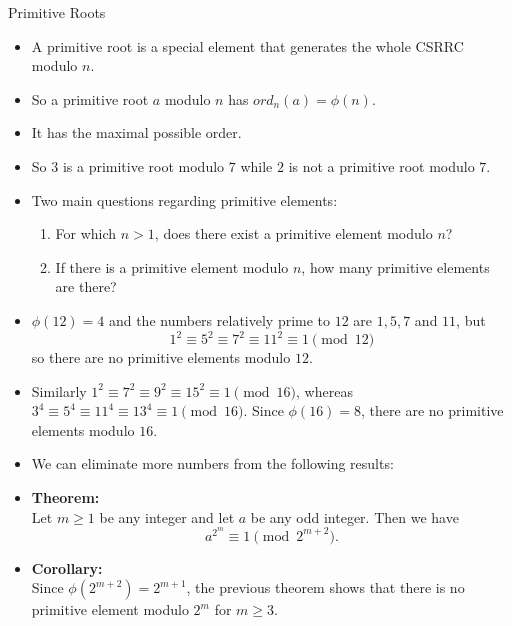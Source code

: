 \documentclass[ %
 usenames,dvipsnames,
aspectratio=169,11pt ]{beamer}
\newenvironment{stepitemize}{\begin{itemize}[<+->]}{\end{itemize} }
\begin{document}
\begin{frame}{Primitive Roots}
\begin{stepitemize}
    \item A primitive root is a special element that generates the whole CSRRC modulo $n$.
    \item So a primitive root $a$ modulo $n$ has $ord_n(a)=\phi(n)$.
    \item It has the maximal possible order.
    \item So $3$ is a primitive root modulo $7$ while $2$ is not a primitive root modulo $7$.
    \item Two main questions regarding primitive elements:
\begin{enumerate}
    \item For which $n>1$, does there exist a primitive element modulo $n$?
    \item If there is a primitive element modulo $n$, how many primitive elements are there?
\end{enumerate}
\end{stepitemize}
\end{frame}

\begin{frame}
\begin{stepitemize}
    \item  $\phi(12)=4$ and the numbers relatively prime to $12$ are $1, 5, 7$ and $11$, but
$$1^2\equiv 5^2\equiv 7^2\equiv 11^2 \equiv 1 \pmod{12}$$ so there are no primitive elements modulo $12$.
\item Similarly $1^2 \equiv 7^2 \equiv 9^2 \equiv 15^2 \equiv 1 \pmod{16}$, whereas $3^4 \equiv5^4\equiv 11^4 \equiv 13^4 \equiv 1 \pmod{16}$. Since $\phi(16)=8$, there are no primitive elements modulo $16$.
\item We can eliminate more numbers from the following results:
\item {\bf Theorem:} \\
Let $m\geq 1$ be any integer and let $a$ be any odd integer. Then we have
$$a^{2^m} \equiv 1 \pmod{2^{m+2}}.$$
\item {\bf Corollary:} \\
Since $\phi(2^{m+2})=2^{m+1}$, the previous theorem shows that there is no primitive element modulo $2^{m}$ for $m\geq 3$.
\end{stepitemize}

\end{frame}
\end{document}
